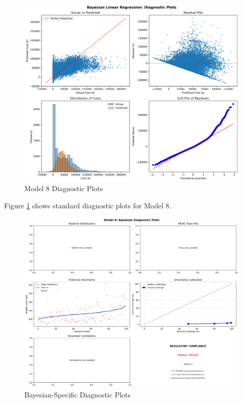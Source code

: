 \begin{figure}[h!]
\centering
\includegraphics[width=\textwidth]{models/model_8/diagnostic_plots.png}
\caption{Model 8 Diagnostic Plots}
\label{fig:model8_diagnostics}
\end{figure}

Figure \ref{fig:model8_diagnostics} shows standard diagnostic plots for Model 8.

\begin{figure}[h!]
\centering
\includegraphics[width=\textwidth]{models/model_8/bayesian_diagnostic_plots.png}
\caption{Bayesian-Specific Diagnostic Plots}
\label{fig:model8_bayesian}
\end{figure}

